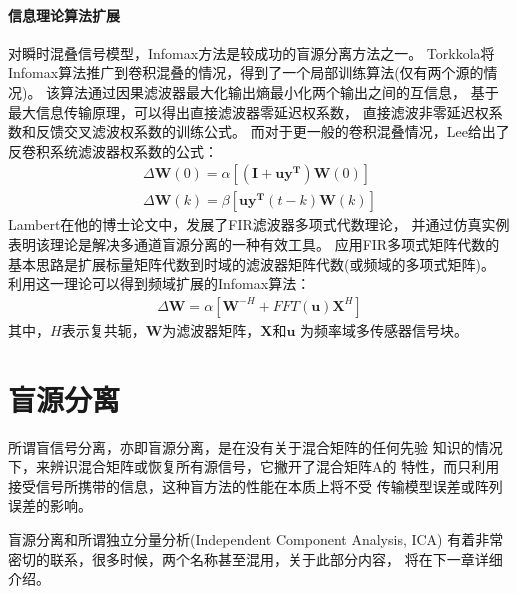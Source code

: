 \paragraph*{信息理论算法扩展}
对瞬时混叠信号模型，Infomax方法是较成功的盲源分离方法之一。
Torkkola将Infomax算法推广到卷积混叠的情况，得到了一个局部训练算法(仅有两个源的情况)。
该算法通过因果滤波器最大化输出熵最小化两个输出之间的互信息，
基于最大信息传输原理，可以得出直接滤波器零延迟权系数，
直接滤波非零延迟权系数和反馈交叉滤波权系数的训练公式。
而对于更一般的卷积混叠情况，Lee给出了反卷积系统滤波器权系数的公式：
\begin{eqnarray}
\Delta\bm{W}(0)	= \alpha [\bm{(I+uy^T)W}(0)] \\
\Delta\bm{W}(k)	= \beta [\bm{uy^T}(t-k)\bm{W}(k)]
\end{eqnarray}
Lambert在他的博士论文中，发展了FIR滤波器多项式代数理论，
并通过仿真实例表明该理论是解决多通道盲源分离的一种有效工具。
应用FIR多项式矩阵代数的基本思路是扩展标量矩阵代数到时域的滤波器矩阵代数(或频域的多项式矩阵)。
利用这一理论可以得到频域扩展的Infomax算法：
\begin{eqnarray}
\Delta\bm{W} = \alpha [\bm{W}^{-H}+FFT(\bm{u})\bm{X}^H]
\end{eqnarray}
其中，$H$表示复共轭，$\bm{W}$为滤波器矩阵，$\bm{X}$和$\bm{u}$
为频率域多传感器信号块。

\section{盲源分离}
所谓盲信号分离，亦即盲源分离，是在没有关于混合矩阵的任何先验
知识的情况下，来辨识混合矩阵或恢复所有源信号，它撇开了混合矩阵A的
特性，而只利用接受信号所携带的信息，这种盲方法的性能在本质上将不受
传输模型误差或阵列误差的影响。

盲源分离和所谓独立分量分析(Independent Component Analysis, ICA)
有着非常密切的联系，很多时候，两个名称甚至混用，关于此部分内容，
将在下一章详细介绍。


